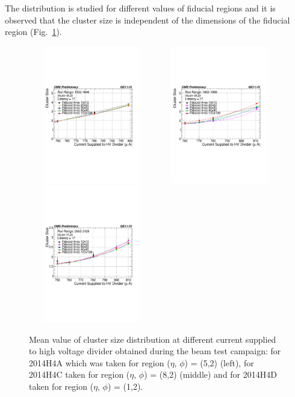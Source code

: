 The distribution is studied for different values of fiducial regions and it is observed that the cluster size is independent of the dimensions of the fiducial region (Fig.~\ref{fig:CSDfiducialregion}).
\begin{figure}[!htbp]
    \begin{center}
      \includegraphics[width=5.5cm,height=6cm]{figures/GEM/CurrentvsClusterSizeR1592R1646.pdf}%
      \includegraphics[width=5.5cm,height=6cm]{figures/GEM/CurrentvsClusterSizeR1869R1903.pdf}%
      \includegraphics[width=5.5cm,height=6cm]{figures/GEM/CurrentvsClusterSizeR2065R2123.pdf}
    \end{center}
    \caption{Mean value of cluster size distribution at different current supplied to high voltage divider obtained during the beam test campaign: for 2014H4A which was taken for region ($\eta$, $\phi$) = (5,2) (left), for 2014H4C taken for region ($\eta$, $\phi$) = (8,2) (middle) and for 2014H4D taken for region ($\eta$, $\phi$) = (1,2).}
  \label{fig:CSDfiducialregion}
\end{figure}
